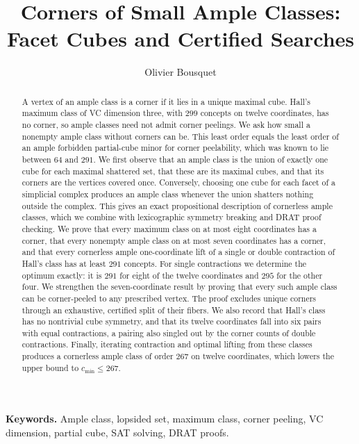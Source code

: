 \documentclass[11pt]{article}
\title{Corners of Small Ample Classes:\\ Facet Cubes and Certified Searches}
\author{Olivier Bousquet}
\date{}
\numberwithin{equation}{section}
\theoremstyle{definition}
\theoremstyle{remark}
\newcommand{\cmin}{c_{\min}}
\begin{document}
\maketitle

\begin{abstract}
A vertex of an ample class is a corner if it lies in a unique maximal
cube.  Hall's maximum class of VC dimension three, with \(299\) concepts on
twelve coordinates, has no corner, so ample classes need not admit corner
peelings.  We ask how small a nonempty ample class without corners can be.
This least order equals the least order of an ample forbidden
partial-cube minor for corner peelability, which was known to lie between
\(64\) and \(291\).  We first observe that an ample class is the union of
exactly one cube for each maximal shattered set, that these are its maximal
cubes, and that its corners are the vertices covered once.  Conversely,
choosing one cube for each facet of a simplicial complex produces an ample
class whenever the union shatters nothing outside the complex.  This gives
an exact propositional description of cornerless ample classes, which we
combine with lexicographic symmetry breaking and DRAT proof checking.  We
prove that every maximum class on at most eight coordinates has a corner,
that every nonempty ample class on at most seven coordinates has a corner,
and that every cornerless ample one-coordinate lift of a single or double
contraction of Hall's class has at least \(291\)
concepts.  For single contractions we determine the optimum exactly: it is
\(291\) for eight of the twelve coordinates and \(295\) for the other four.
We strengthen the seven-coordinate result by proving that every such ample
class can be corner-peeled to any prescribed vertex. The proof excludes
unique corners through an exhaustive, certified split of their fibers.
We also record that Hall's class has no nontrivial cube symmetry, and that
its twelve coordinates fall into six pairs with equal contractions, a
pairing also singled out by the corner counts of double contractions.
Finally, iterating contraction and optimal lifting from these classes
produces a cornerless ample class of order \(267\) on twelve coordinates,
which lowers the upper bound to \(\cmin\le267\).
\end{abstract}

\medskip
\noindent\textbf{Keywords.}
Ample class, lopsided set, maximum class, corner peeling, VC dimension,
partial cube, SAT solving, DRAT proofs.

\tableofcontents
\end{document}
